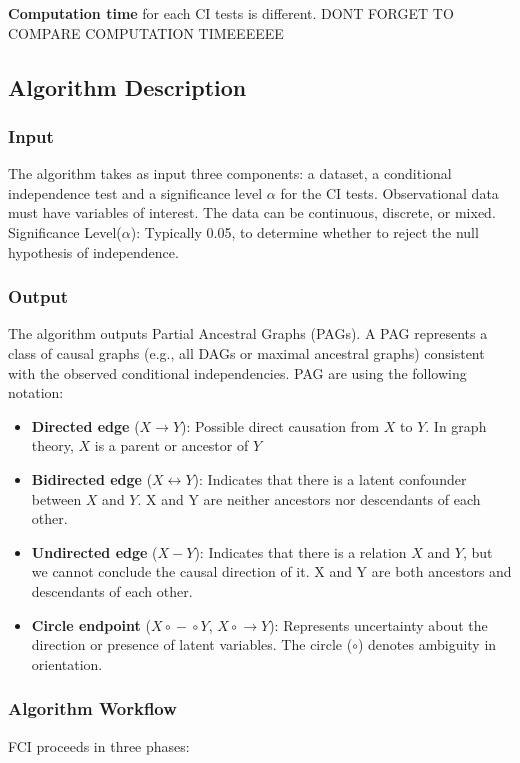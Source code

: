 \documentclass[main.tex]{subfiles}
\begin{document}
\textbf{Computation time} for each CI tests is different. DONT FORGET TO COMPARE COMPUTATION TIMEEEEEE


\subsection{Algorithm Description}
\subsubsection{Input}
The algorithm takes as input three components: a dataset, a conditional independence test and a significance level $\alpha$ for the CI tests. Observational data must have variables of interest. The data can be continuous, discrete, or mixed.
Significance Level($\alpha$): Typically 0.05, to determine whether to reject the null hypothesis of independence.

\subsubsection{Output}
The algorithm outputs Partial Ancestral Graphs (PAGs). A PAG represents a class of causal graphs (e.g., all DAGs or maximal ancestral graphs) consistent with the observed conditional independencies. PAG are using the following notation:
\begin{itemize}
        \item \textbf{Directed edge} ($X \rightarrow Y$): Possible direct causation from $X$ to $Y$. In graph theory, $X$ is a parent or ancestor of $Y$
        \item \textbf{Bidirected edge} ($X \leftrightarrow Y$): Indicates that there is a latent confounder between $X$ and $Y$. X and Y are neither ancestors nor descendants of each other.
        \item \textbf{Undirected edge} ($X - Y$): Indicates that there is a relation $X$ and $Y$, but we cannot conclude the causal direction of it. X and Y are both ancestors and descendants of each other.
        \item \textbf{Circle endpoint} ($X \circ\!\!-\!\!\circ Y$, $X \circ\!\!\rightarrow Y$): Represents uncertainty about the direction or presence of latent variables. The circle ($\circ$) denotes ambiguity in orientation.
    \end{itemize}
    
\subsubsection{Algorithm Workflow}
FCI proceeds in three phases:
\end{document}
